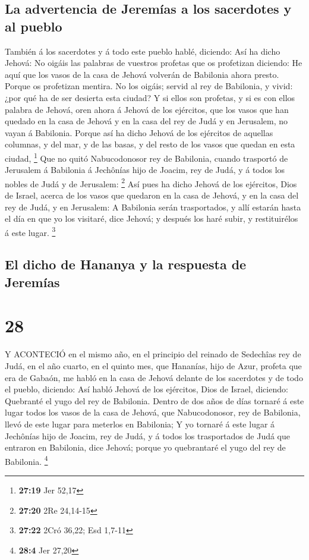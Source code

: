 \hypertarget{la-advertencia-de-jeremuxedas-a-los-sacerdotes-y-al-pueblo}{%
\subsection{La advertencia de Jeremías a los sacerdotes y al
pueblo}\label{la-advertencia-de-jeremuxedas-a-los-sacerdotes-y-al-pueblo}}

 También á los sacerdotes y á todo este pueblo hablé,
diciendo: Así ha dicho Jehová: No oigáis las palabras de vuestros
profetas que os profetizan diciendo: He aquí que los vasos de la casa de
Jehová volverán de Babilonia ahora presto. Porque os profetizan mentira.
 No los oigáis; servid al rey de Babilonia, y vivid: ¿por
qué ha de ser desierta esta ciudad?  Y si ellos son
profetas, y si es con ellos palabra de Jehová, oren ahora á Jehová de
los ejércitos, que los vasos que han quedado en la casa de Jehová y en
la casa del rey de Judá y en Jerusalem, no vayan á Babilonia.
 Porque así ha dicho Jehová de los ejércitos de aquellas
columnas, y del mar, y de las basas, y del resto de los vasos que quedan
en esta ciudad, \footnote{\textbf{27:19} Jer 52,17}  Que no
quitó Nabucodonosor rey de Babilonia, cuando trasportó de Jerusalem á
Babilonia á Jechônías hijo de Joacim, rey de Judá, y á todos los nobles
de Judá y de Jerusalem: \footnote{\textbf{27:20} 2Re 24,14-15}
 Así pues ha dicho Jehová de los ejércitos, Dios de Israel,
acerca de los vasos que quedaron en la casa de Jehová, y en la casa del
rey de Judá, y en Jerusalem:  A Babilonia serán
trasportados, y allí estarán hasta el día en que yo los visitaré, dice
Jehová; y después los haré subir, y restituirélos á este lugar.
\footnote{\textbf{27:22} 2Cró 36,22; Esd 1,7-11}

\hypertarget{el-dicho-de-hananya-y-la-respuesta-de-jeremuxedas}{%
\subsection{El dicho de Hananya y la respuesta de
Jeremías}\label{el-dicho-de-hananya-y-la-respuesta-de-jeremuxedas}}

\hypertarget{section-27}{%
\section{28}\label{section-27}}

 Y ACONTECIÓ en el mismo año, en el principio del reinado de
Sedechîas rey de Judá, en el año cuarto, en el quinto mes, que Hananías,
hijo de Azur, profeta que era de Gabaón, me habló en la casa de Jehová
delante de los sacerdotes y de todo el pueblo, diciendo: 
Así habló Jehová de los ejércitos, Dios de Israel, diciendo: Quebranté
el yugo del rey de Babilonia.  Dentro de dos años de días
tornaré á este lugar todos los vasos de la casa de Jehová, que
Nabucodonosor, rey de Babilonia, llevó de este lugar para meterlos en
Babilonia;  Y yo tornaré á este lugar á Jechônías hijo de
Joacim, rey de Judá, y á todos los trasportados de Judá que entraron en
Babilonia, dice Jehová; porque yo quebrantaré el yugo del rey de
Babilonia. \footnote{\textbf{28:4} Jer 27,20}

